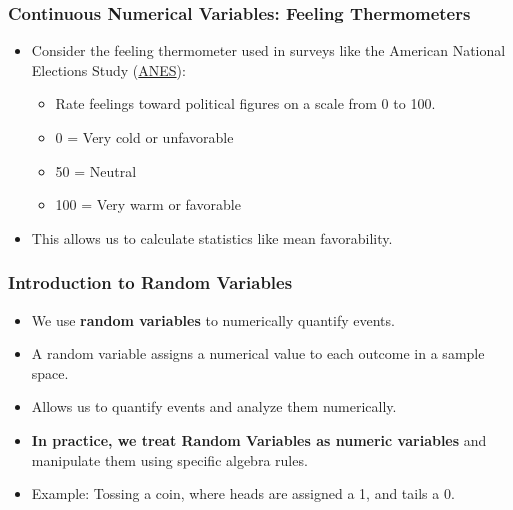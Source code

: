 \documentclass[handout]{beamer} %
\begin{document}
\begin{frame}
    \frametitle{Continuous Numerical Variables: Feeling Thermometers}
    \begin{itemize}
        \item Consider the feeling thermometer used in surveys like the American National Elections Study (\href{https://electionstudies.org/}{ANES}): \pause
        \begin{itemize}
            \item Rate feelings toward political figures on a scale from 0 to 100. \pause
            \item 0 = Very cold or unfavorable \pause
            \item 50 = Neutral \pause
            \item 100 = Very warm or favorable \pause
        \end{itemize}
        \item This allows us to calculate statistics like mean favorability. 
    \end{itemize}
\end{frame}

\begin{frame}
    \frametitle{Introduction to Random Variables}
    \begin{itemize}
        \item We use \textbf{random variables} to numerically quantify events. \pause
        \item A random variable assigns a numerical value to each outcome in a sample space. \pause
        
     \pause
    
        \item Allows us to quantify events and analyze them numerically. \pause
        \item \textbf{In practice, we treat Random Variables as numeric variables} and manipulate them using specific algebra rules.
        \item Example: Tossing a coin, where heads are assigned a 1, and tails a 0. \pause
    \end{itemize}


    
\end{frame}
\end{document}
